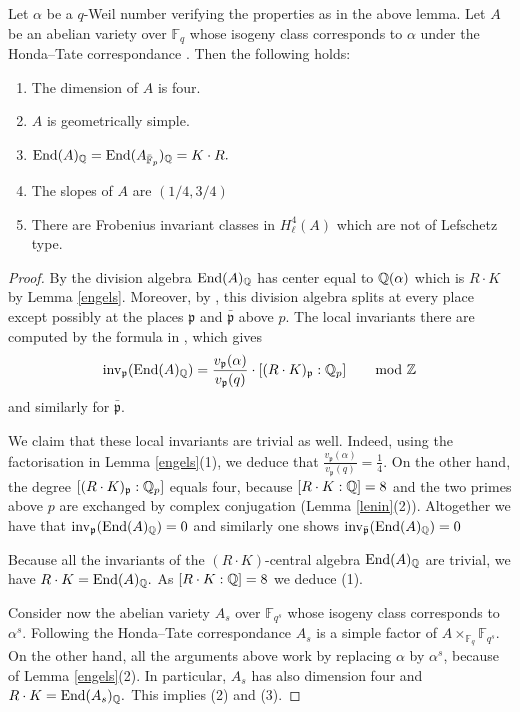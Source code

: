 \documentclass[11pt]{amsart}
\begin{document}
\begin{appendices}
\begin{lemma}\label{elche}
Let $\alpha$ be a $q$-Weil number verifying the properties as in the above lemma. Let $A$ be an abelian variety over $\mathbb{F}_{q}$ whose isogeny class  corresponds to $\alpha$ under the Honda--Tate correspondance \cite{TateBour}. Then the following holds:
\begin{enumerate}
\item  The dimension of $A$ is four.
\item  $A$ is geometrically simple.
\item $\textnormal{End} (A)_{\mathbb{Q}} = \textnormal{End} (A_{\bar{\mathbb{F}}_p})_{\mathbb{Q}} = K \cdot R.$
\item The slopes of $A$ are $(1/4,3/4)$
\item There are Frobenius invariant classes in $H_\ell^4(A)$ which are not of Lefschetz type.
\end{enumerate}
\end{lemma}
\begin{proof}
By \cite{Tate} the division algebra $ \textnormal{End} (A)_{\mathbb{Q}}$ has center equal to $\mathbb{Q}(\alpha)$ which is  $R\cdot K$ by Lemma \ref{engels}. Moreover, by \cite[Theorem 1]{TateBour}, this division algebra  splits at every place except possibly at  the places $\mathfrak{p}$ and $\bar{\mathfrak{p}}$ above $p$. The local invariants there are computed by the formula in \cite[Theorem 1]{TateBour}, which gives
\[\mathrm{inv}_\mathfrak{p}( \textnormal{End} (A)_{\mathbb{Q}})=\frac{v_\mathfrak{p}(\alpha)}{v_\mathfrak{p}(q)}\cdot [(R\cdot K)_\mathfrak{p}:\mathbb{Q}_p] \hspace{0.5cm} \mod {\mathbb{Z}}\]
and similarly for $\bar{\mathfrak{p}}$. 

We claim that these local invariants are trivial as well. Indeed, using the factorisation in Lemma \ref{engels}(1), we deduce that $\frac{v_\mathfrak{p}(\alpha)}{v_\mathfrak{p}(q)}=\frac{1}{4}.$ On the other hand, the degree $[(R\cdot K)_\mathfrak{p}:\mathbb{Q}_p]$ equals four, because  $[R\cdot K:\mathbb{Q}]=8$ and the two primes above $p$ are exchanged by  complex conjugation (Lemma \ref{lenin}(2)). Altogether we have that $\mathrm{inv}_\mathfrak{p}( \textnormal{End} (A)_{\mathbb{Q}})=0$ and similarly one shows $\mathrm{inv}_{\bar{\mathfrak{p}}}( \textnormal{End} (A)_{\mathbb{Q}})=0$ 

Because all the invariants of the $(R\cdot K)$-central algebra $ \textnormal{End} (A)_{\mathbb{Q}}$ are trivial, we have 
$R\cdot K= \textnormal{End} (A)_{\mathbb{Q}}.$  As ${[R\cdot K:\mathbb{Q}]=8}$  we deduce (1). 

Consider now the abelian variety $A_s$  over $\mathbb{F}_{q^s}$ whose isogeny class  corresponds to $\alpha^s$. Following the Honda--Tate correspondance $A_s$ is a simple factor of $A \times_{\mathbb{F}_q} \mathbb{F}_{q^s} $. On the other hand, all the arguments above work  by replacing $\alpha$ by  $\alpha^s$, because of  Lemma \ref{engels}(2). In particular, $A_s$  has also dimension four and $R\cdot K= \textnormal{End} (A_s)_{\mathbb{Q}}.$ This implies (2) and (3).


\end{proof}
\end{appendices}
\end{document}
